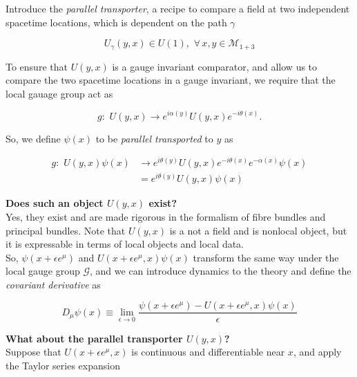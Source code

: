 \noindent Introduce the \textit{parallel transporter}, a recipe to compare a field at two independent spacetime locations, which is dependent on the path $\gamma$

\begin{equation}
U_\gamma (y,x) \in U(1), \,\, \forall \, x, y \in \mathcal{M}_{1+3}
\end{equation}

\noindent To ensure that $U(y,x)$ is a gauge invariant comparator, and allow us to compare the two spacetime locations in a gauge invariant, we require that the local gauage group act as

\begin{equation}
g: \,\, U(y,x) \rightarrow e^{i \alpha (y)} U(y,x) e^{-i \theta(x)}.
\end{equation}

\noindent So, we define $\psi(x)$ to be \textit{parallel transported} to $y$ as

\begin{align}
g: \,\, U(y,x) \psi(x) &\rightarrow e^{i \theta(y)} U(y,x) e^{-i \theta(x) }e^{- \alpha (x)} \psi(x) \\
&= e^{i \theta(y)} U(y,x)  \psi(x)
\end{align}

\noindent \textbf{Does such an object $U(y,x)$ exist?} \\

\noindent Yes, they exist and are made rigorous in the formalism of fibre bundles and principal bundles. Note that $U(y,x)$ is a not a field and is nonlocal object, but it is expressable in terms of local objects and local data. \\

\noindent So, $\psi(x + \epsilon e^\mu)$ and $U(x+\epsilon e^\mu, x)\psi(x)$ transform the same way under the local gauge group $\mathcal{G}$, and we can introduce dynamics to the theory and define the \textit{covariant derivative} as

\begin{equation}
D_\mu \psi (x) \equiv \lim_{\epsilon \rightarrow 0} \frac{\psi (x + \epsilon e^\mu) - U (x + \epsilon e^\mu, x) \psi (x)}{\epsilon}
\end{equation}

\noindent \textbf{What about the parallel transporter $U(y,x)$?} \\

\noindent Suppose that $U(x + \epsilon e^\mu , x)$ is continuous and differentiable near $x$, and apply the Taylor series expansion


